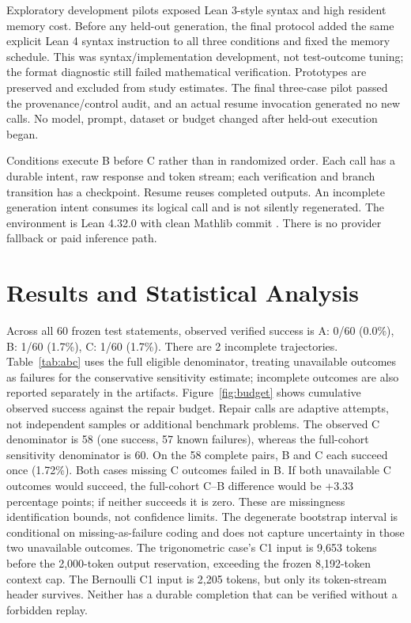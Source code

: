 \documentclass[runningheads,a4paper]{llncs}
\begin{document}
Exploratory development pilots exposed Lean 3-style syntax and high resident
memory cost. Before any held-out generation, the final protocol added the same
explicit Lean 4 syntax instruction to all three conditions and fixed the memory
schedule. This was syntax/implementation development, not test-outcome tuning;
the format diagnostic still failed mathematical verification. Prototypes are
preserved and excluded from study estimates. The final three-case pilot passed
the provenance/control audit, and an actual resume invocation generated no new
calls. No model, prompt, dataset or budget changed after held-out execution began.

Conditions execute B before C rather than in randomized order. Each call has a
durable intent, raw response and token stream; each verification and branch
transition has a checkpoint. Resume reuses completed outputs. An incomplete
generation intent consumes its logical call and is not silently regenerated.
The environment is Lean 4.32.0 with clean Mathlib commit
. There is no provider fallback or paid inference path.

\section{Results and Statistical Analysis}
Across all 60 frozen test statements, observed verified success is A: 0/60 (0.0\%), B: 1/60 (1.7\%), C: 1/60 (1.7\%).
There are 2 incomplete trajectories. Table~\ref{tab:abc} uses the
full eligible denominator, treating unavailable outcomes as failures for the
conservative sensitivity estimate; incomplete outcomes are also reported
separately in the artifacts. Figure~\ref{fig:budget} shows cumulative observed
success against the repair budget. Repair calls are adaptive attempts, not
independent samples or additional benchmark problems.
The observed C denominator is 58 (one success, 57 known failures), whereas
the full-cohort sensitivity denominator is 60. On the 58 complete pairs, B and C
each succeed once (1.72\%). Both cases missing C outcomes failed in B.
If both unavailable C outcomes would succeed, the full-cohort C--B difference
would be +3.33 percentage points; if neither succeeds it is zero. These are
missingness identification bounds, not confidence limits. The degenerate
bootstrap interval is conditional on missing-as-failure coding and does not
capture uncertainty in those two unavailable outcomes.
The trigonometric case's C1 input is 9,653 tokens before the 2,000-token output
reservation, exceeding the frozen 8,192-token context cap. The Bernoulli C1
input is 2,205 tokens, but only its token-stream header survives. Neither has
a durable completion that can be verified without a forbidden replay.

\end{document}
